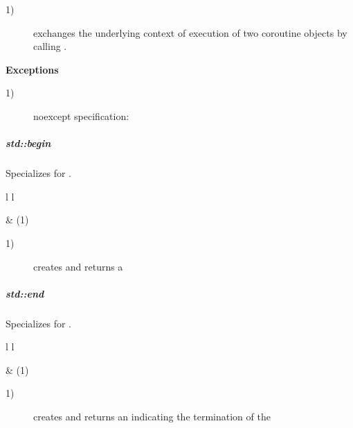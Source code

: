 \begin{description}
    \item[1)] exchanges the underlying context of execution of two coroutine
              objects by calling . 
\end{description}

{\bf Exceptions}
\begin{description}
    \item[1)] noexcept specification: 
\end{description}

\subparagraph*{std::begin}
Specializes  for \pullcoro.

\begin{tabular}{ l l }
    \midrule

     & (1)\\

    \midrule
\end{tabular}

\begin{description}
    \item[1)] creates and returns a 
\end{description}

\subparagraph*{std::end}
Specializes  for \pullcoro.

\begin{tabular}{ l l }
    \midrule

     & (1)\\

    \midrule
\end{tabular}

\begin{description}
    \item[1)] creates and returns an  indicating the termination of the \corofunction
\end{description}

